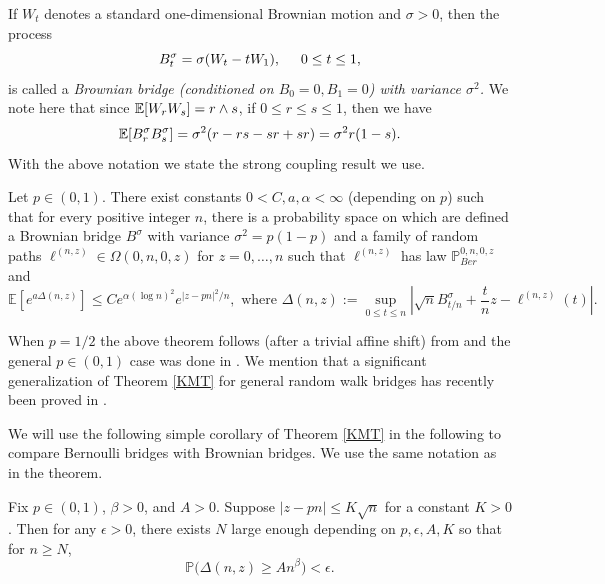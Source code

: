 If $W_t$ denotes a standard one-dimensional Brownian motion and $\sigma > 0$, then the process
$$B^{\sigma}_t = \sigma (W_t - t W_1), \hspace{5mm} 0 \leq t \leq 1,$$
is called a {\em Brownian bridge (conditioned on $B_0 = 0, B_1 = 0$)  with variance $\sigma^2$.} We note here that since $\mathbb{E}[W_rW_s] = r\wedge s$, if $0\leq r\leq s\leq 1$, then we have
\begin{equation}\label{BBcovar}
\mathbb{E}[B^\sigma_r B^\sigma_s] = \sigma^2(r - rs - sr + sr) = \sigma^2 r(1-s).
\end{equation}  
With the above notation we state the strong coupling result we use.
\begin{theorem}\label{KMT}
Let $p \in (0,1)$. There exist constants $0 < C, a, \alpha < \infty$ (depending on $p$) such that for every positive integer $n$, there is a probability space on which are defined a Brownian bridge $B^\sigma$ with variance $\sigma^2 = p(1-p)$ and a family of random paths $\ell^{(n,z)} \in \Omega(0,n, 0, z)$ for $z = 0,\dots,n$ such that $\ell^{(n,z)}$ has law $\mathbb{P}^{0,n,0,z}_{Ber}$ and
\begin{equation}\label{KMTeq}
\mathbb{E}\left[ e^{a \Delta(n,z)} \right] \leq C e^{\alpha (\log n)^2}e^{|z- p n|^2/n}, \mbox{ where $\Delta(n,z):=  \sup_{0 \leq t \leq n} \left| \sqrt{n} B^\sigma_{t/n} + \frac{t}{n}z - \ell^{(n,z)}(t) \right|.$}
\end{equation}
\end{theorem}
\begin{remark} When $p = 1/2$ the above theorem follows (after a trivial affine shift) from \cite[Theorem 6.3]{LF} and the general $p \in (0,1)$ case was done in \cite[Theorem 4.5]{CD}. We mention that a significant generalization of Theorem \ref{KMT} for general random walk bridges has recently been proved in \cite[Theorem 2.3]{DW19}.
\end{remark}

We will use the following simple corollary of Theorem \ref{KMT} in the following to compare Bernoulli bridges with Brownian bridges. We use the same notation as in the theorem.

\begin{corollary}\label{Cheb}
	Fix $p\in (0,1)$, $\beta > 0$, and $A>0$. Suppose $|z-pn| \leq K\sqrt{n}$ for a constant $K>0$. Then for any $\epsilon > 0$, there exists $N$ large enough depending on $p,\epsilon,A,K$ so that for $n\geq N$,
	\[
	\mathbb{P}\Big(\Delta(n,z) \geq An^\beta\Big) < \epsilon.
	\]
\end{corollary}

